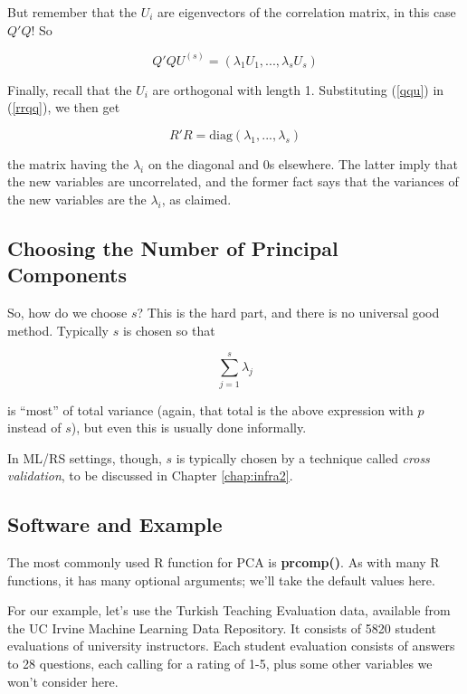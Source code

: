 But remember that the $U_i$ are eigenvectors of the correlation matrix,
in this case $Q'Q$!  So

\begin{equation}
\label{qqu}
Q'Q U^{(s)} = (\lambda_1 U_1,...,\lambda_s U_s)
\end{equation}

Finally, recall that the $U_i$ are orthogonal with length 1.
Substituting (\ref{qqu}) in (\ref{rrqq}), we then get

\begin{equation}
R'R = \textrm{diag}(\lambda_1,...,\lambda_s)
\end{equation}

the matrix having the $\lambda_i$ on the diagonal and 0s elsewhere.  The
latter imply that the new variables are uncorrelated, and the former
fact says that the variances of the new variables are the $\lambda_i$,
as claimed.

\subsection{Choosing the Number of Principal Components}

So, how do we choose $s$?  This is the hard part, and there is no 
universal good method.  Typically $s$ is chosen so that 

\begin{equation}
\sum_{j=1}^s \lambda_j
\end{equation}

is ``most'' of total variance (again, that total is the above expression
with $p$ instead of $s$), but even this is usually done informally.

In ML/RS settings, though, $s$ is typically chosen by a technique called
\textit{cross validation}, to be discussed in Chapter \ref{chap:infra2}.

\subsection{Software and Example}

The most commonly used R function for PCA is \textbf{prcomp()}.  As with
many R functions, it has many optional arguments; we'll take the default
values here.

For our example, let's use the Turkish Teaching Evaluation data,
available from the UC Irvine Machine Learning Data Repository.  It
consists of 5820 student evaluations of university instructors.  Each
student evaluation consists of answers to 28 questions, each calling for
a rating of 1-5, plus some other variables we won't consider here.

